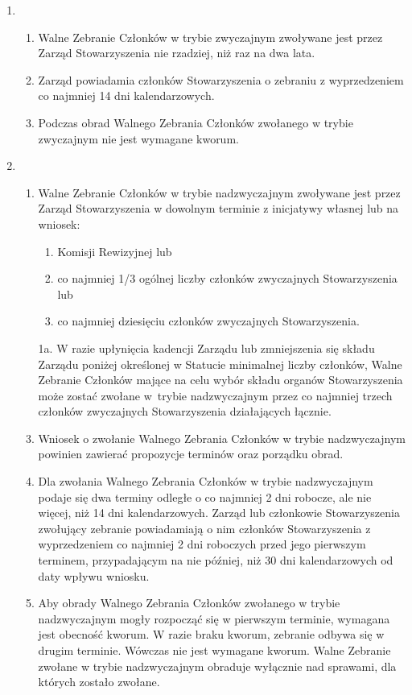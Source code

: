 \documentclass[chapterprefix,notitlepage]{article}
\begin{document}
\begin{enumerate}
	\item \begin{enumerate}
		\item Walne Zebranie Członków w trybie zwyczajnym zwoływane jest przez Zarząd Stowarzyszenia nie rzadziej, niż raz na dwa lata.
		\item Zarząd powiadamia członków Stowarzyszenia o zebraniu z wyprzedzeniem co najmniej 14 dni kalendarzowych.
		\item Podczas obrad Walnego Zebrania Członków zwołanego w trybie zwyczajnym nie jest wymagane kworum.
	\end{enumerate}
	
	\item \begin{enumerate}
		\item Walne Zebranie Członków w trybie nadzwyczajnym zwoływane jest przez Zarząd Stowarzyszenia w dowolnym terminie z inicjatywy własnej lub na wniosek:
		\begin{enumerate}
			\item Komisji Rewizyjnej lub
			\item co najmniej 1/3 ogólnej liczby członków zwyczajnych Stowarzyszenia lub
			\item co najmniej dziesięciu członków zwyczajnych Stowarzyszenia.
		\end{enumerate}
		\item[1a.] W razie upłynięcia kadencji Zarządu lub zmniejszenia się składu Zarządu poniżej określonej w Statucie minimalnej liczby członków, Walne Zebranie Członków mające na celu wybór składu organów Stowarzyszenia może zostać zwołane w~trybie nadzwyczajnym przez co najmniej trzech członków zwyczajnych Stowarzyszenia działających łącznie.
		\item Wniosek o zwołanie Walnego Zebrania Członków w trybie nadzwyczajnym powinien zawierać propozycje terminów oraz porządku obrad.
		\item Dla zwołania Walnego Zebrania Członków w trybie nadzwyczajnym podaje się dwa terminy odległe o co najmniej 2 dni robocze, ale nie więcej, niż 14 dni kalendarzowych. Zarząd lub członkowie Stowarzyszenia zwołujący zebranie powiadamiają o nim członków Stowarzyszenia z wyprzedzeniem co najmniej 2 dni roboczych przed jego pierwszym terminem, przypadającym na nie później, niż 30 dni kalendarzowych od daty wpływu wniosku.
		\item Aby obrady Walnego Zebrania Członków zwołanego w trybie nadzwyczajnym mogły rozpocząć się w pierwszym terminie, wymagana jest obecność kworum. W razie braku kworum, zebranie odbywa się w drugim terminie. Wówczas nie jest wymagane kworum. Walne Zebranie zwołane w trybie nadzwyczajnym obraduje wyłącznie nad sprawami, dla których zostało zwołane.
	\end{enumerate}
	

\end{enumerate}
\end{document}
